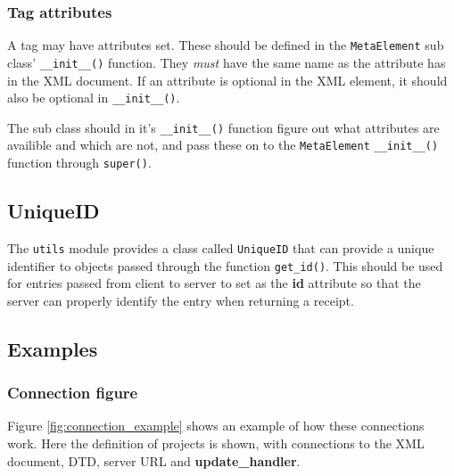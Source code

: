 \subsubsection{Tag attributes}
A tag may have attributes set. These should be defined in the
\texttt{MetaElement} sub class' \texttt{\_\_init\_\_()} function. They
\textit{must} have the same name as the attribute has in the XML document. If
an attribute is optional in the XML element, it should also be optional in
\texttt{\_\_init\_\_()}. 

The sub class should in it's \texttt{\_\_init\_\_()} function figure out what
attributes are availible and which are not, and pass these on to the
\texttt{MetaElement} \texttt{\_\_init\_\_()} function through \texttt{super()}. 

\subsection{UniqueID}
The \texttt{utils} module provides a class called \texttt{UniqueID} that can
provide a unique identifier to objects passed through the function
\texttt{get\_id()}. This should be used for entries passed from client to
server to set as the \textbf{id} attribute so that the server can properly
identify the entry when returning a receipt. 

\subsection{Examples}

\subsubsection{Connection figure}
Figure \ref{fig:connection_example} shows an example of how these connections
work. Here the definition of projects is shown, with connections to the XML
document, DTD, server URL and \textbf{update\_handler}.

